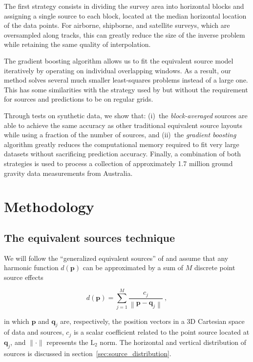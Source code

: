 The first strategy consists in dividing the survey area into horizontal blocks
and assigning a single source to each block, located at the median horizontal
location of the data points.
For airborne, shipborne, and satellite surveys, which are oversampled along
tracks, this can greatly reduce the size of the inverse problem while retaining
the same quality of interpolation.

The gradient boosting algorithm allows us to fit the equivalent source model
iteratively by operating on individual overlapping windows.
As a result, our method solves several much smaller least-squares problems
instead of a large one.
This has some similarities with the strategy used by \citet{leao1989} but
without the requirement for sources and predictions to be on regular grids.

Through tests on synthetic data, we show that:
(i)~the \emph{block-averaged} sources are able to achieve the same accuracy as
other traditional equivalent source layouts while using a fraction of the
number of sources, and
(ii)~the \emph{gradient boosting} algorithm greatly reduces the computational
memory required to fit very large datasets without sacrificing prediction
accuracy.
Finally, a combination of both strategies is used to process a collection of
approximately 1.7 million ground gravity data measurements from Australia.


\section{Methodology}

\subsection{The equivalent sources technique}

We will follow the ``generalized equivalent sources'' of \citet{cordell1992}
and assume that any harmonic function $d(\mathbf{p})$ can be approximated by a
sum of $M$ discrete point source effects

\begin{equation}
    d(\mathbf{p})
    =
    \sum\limits_{j=1}^{M} \frac{c_j}{\left\lVert \mathbf{p} - \mathbf{q}_j
    \right\rVert} \ ,
    \label{eq:eql-forward}
\end{equation}

\noindent in which
$\mathbf{p}$ and $\mathbf{q}_j$ are, respectively, the position vectors in a 3D
Cartesian space of data and sources,
$c_j$ is a scalar coefficient related to the point source located at
$\mathbf{q}_j$,
and $\lVert \cdot \rVert$ represents the $\text{L}_2$ norm.
The horizontal and vertical distribution of sources is discussed in
section~\ref{sec:source_distribution}.

